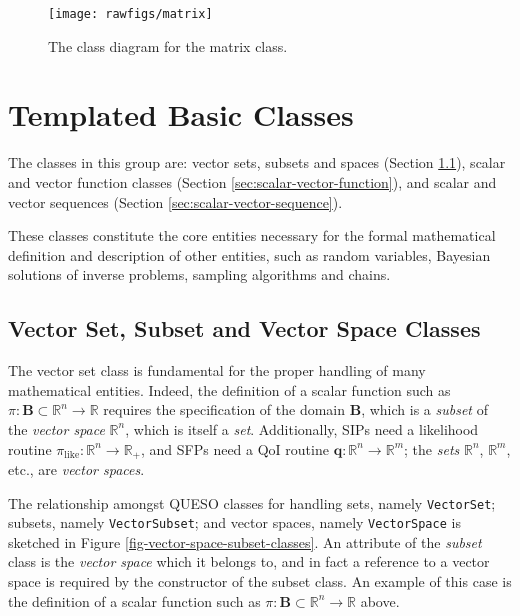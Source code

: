 \begin{figure}[!hp]
\centering
\vspace*{-.8cm}
\texttt{[image: rawfigs/matrix]}
\vspace*{-.8cm}
\caption{The class diagram for the matrix class.}%
\label{fig-matrix-class}
\end{figure}


\section{Templated Basic Classes}
The classes in this group are: vector sets, subsets and spaces (Section \ref{sec:vector-set-space}), scalar and vector function classes (Section \ref{sec:scalar-vector-function}), and scalar and vector sequences (Section \ref{sec:scalar-vector-sequence}).

These classes constitute the core entities necessary for the formal
mathematical definition and description of other entities, such as
random variables, Bayesian solutions of inverse problems, sampling algorithms and chains.



\subsection{Vector Set, Subset  and Vector Space Classes}\label{sec:vector-set-space}
%
The vector set class is fundamental for the proper handling of many mathematical entities.
Indeed, the definition of a scalar function such as $\pi:\mathbf{B}\subset\mathbb{R}^n\rightarrow\mathbb{R}$ requires the
specification of the domain $\mathbf{B}$, which is a {\it subset} of the {\it vector space} $\mathbb{R}^n$, which is itself a {\it set}. Additionally,
 SIPs need a likelihood routine $\pi_{\text{like}}:\mathbb{R}^n\rightarrow\mathbb{R}_+$,
and SFPs need a QoI routine $\mathbf{q}:\mathbb{R}^n\rightarrow\mathbb{R}^m$; the \textit{sets} $\mathbb{R}^n$, $\mathbb{R}^m$, etc., are {\it vector spaces}.


The relationship amongst QUESO classes for handling sets, namely \verb+VectorSet+; subsets, namely \verb+VectorSubset+;  and vector spaces, namely \verb+VectorSpace+ is sketched in Figure \ref{fig-vector-space-subset-classes}.
%
An attribute of the {\it subset} class is the {\it vector space} which it belongs to, and in fact a reference to a vector space is required by the constructor of the subset class. An example of this case is the definition of a scalar function such as $\pi:\mathbf{B}\subset\mathbb{R}^n\rightarrow\mathbb{R}$ above. %

